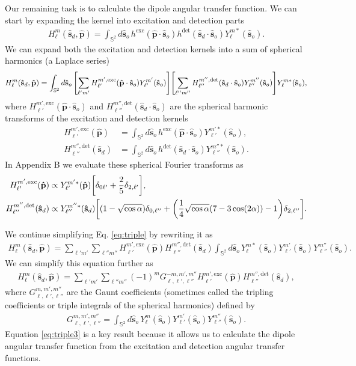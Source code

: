 \documentclass[11pt]{article}
\providecommand{\so}{\mathbf{\hat{s}}_o}
\providecommand{\sd}{\mathbf{\hat{s}}_d}
\providecommand{\pp}{\mathbf{\hat{p}}}
\providecommand{\mbb}[1]{\mathbb{#1}}
\providecommand{\ints}[1]{\int_{\mbb{S}^{#1}}}
\let\originalleft\left
\let\originalright\right
\renewcommand{\left}{\mathopen{}\mathclose\bgroup\originalleft}
\renewcommand{\right}{\aftergroup\egroup\originalright}
\begin{document}
Our remaining task is to calculate the dipole angular transfer function. We can
start by expanding the kernel into excitation and detection parts
\begin{align}
  H_\ell^m(\sd, \pp) = \ints{2}d\so\, h^{\text{exc}}(\pp\cdot\so)h^{\text{det}}(\sd\cdot\so)Y_\ell^{m*}(\so). 
\end{align}
We can expand both the excitation and detection kernels into a sum of spherical harmonics (a Laplace series)
\begin{align}
    H_\ell^m(\sd, \pp) = \ints{2}d\so\, \left[\sum_{\ell' m'}H_{\ell'}^{m',\text{exc}}(\pp\cdot\so)Y_{\ell'}^{m'}(\so)\right]\left[\sum_{\ell'' m''}H_{\ell''}^{m'',\text{det}}(\sd\cdot\so)Y_{\ell''}^{m''}(\so)\right]Y_\ell^{m*}(\so),\label{eq:triple}
\end{align}
where $H_{\ell'}^{m',\text{exc}}(\pp\cdot\so)$ and $H_{\ell''}^{m'',\text{det}}(\sd\cdot\so)$ are the spherical harmonic transforms of the excitation and detection kernels
\begin{align}
  H_{\ell'}^{m',\text{exc}}(\pp) &= \ints{2}d\so\, h^{\text{exc}}(\pp\cdot\so)Y_{\ell'}^{m'*}(\so),\label{eq:sh1}\\
  H_{\ell''}^{m'',\text{det}}(\sd) &= \ints{2}d\so\, h^{\text{det}}(\sd\cdot\so)Y_{\ell''}^{m''*}(\so)\label{eq:sh2}.
\end{align}
In Appendix B we evaluate these spherical Fourier transforms as
\begin{align}
    H_{\ell'}^{m',\text{exc}}(\pp) &\propto Y_{\ell'}^{m'*}(\pp)\left[\delta_{0\ell'} + \frac{2}{5}\delta_{2,\ell'}\right],\label{eq:dipexc}\\
    H_{\ell''}^{m'',\text{det}}(\sd) &\propto Y_{\ell''}^{m''*}(\sd)\left[(1 - \sqrt{\cos\alpha})\delta_{0,\ell''} + \left(\frac{1}{4}\sqrt{\cos\alpha}(7-3\cos(2\alpha)) - 1\right)\delta_{2,\ell''}\right].\label{eq:dipdet}
\end{align}

We continue simplifying Eq. \eqref{eq:triple} by rewriting it as
\begin{align}
    H_\ell^m(\sd, \pp) = \sum_{\ell' m'}\sum_{\ell'' m''}H_{\ell'}^{m',\text{exc}}(\pp)H_{\ell''}^{m'',\text{det}}(\sd)\ints{2}d\so\, Y_\ell^{m*}(\so)Y_{\ell'}^{m'}(\so)Y_{\ell''}^{m''}(\so).\label{eq:triple2}
\end{align}
We can simplify this equation further as
\begin{align}
    H_\ell^m(\sd, \pp) = \sum_{\ell' m'}\sum_{\ell'' m''}(-1)^m G_{\ell,\ell',\ell''}^{-m,m',m''}H_{\ell'}^{m',\text{exc}}(\pp)H_{\ell''}^{m'',\text{det}}(\sd),\label{eq:triple3}
\end{align}
where $G_{\ell,\ell',\ell''}^{m,m',m''}$ are the Gaunt coefficients (sometimes
called the tripling coefficients or triple integrals of the spherical harmonics)
defined by
\begin{align}
  G_{\ell,\ell',\ell''}^{m,m',m''} = \ints{2}d\so\, Y_\ell^{m}(\so)Y_{\ell'}^{m'}(\so)Y_{\ell''}^{m''}(\so).
\end{align}
Equation \eqref{eq:triple3} is a key result because it allows us to calculate
the dipole angular transfer function from the excitation and detection angular
transfer functions.
\end{document}
